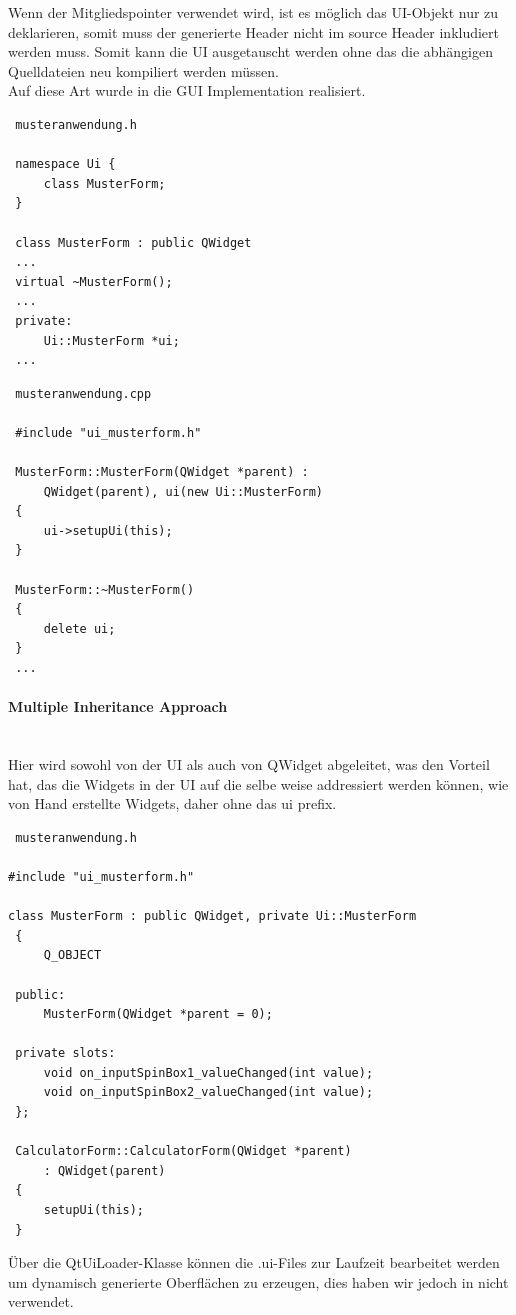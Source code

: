 Wenn der Mitgliedspointer verwendet wird, ist es möglich das UI-Objekt nur zu deklarieren, somit muss der generierte Header nicht im source Header inkludiert werden muss. Somit kann die UI ausgetauscht werden ohne das die abhängigen Quelldateien neu kompiliert werden müssen.\\ Auf diese Art wurde in \EBP die GUI Implementation realisiert. 
\begin{lstlisting}
 musteranwendung.h

 namespace Ui {
     class MusterForm;
 }

 class MusterForm : public QWidget
 ...
 virtual ~MusterForm();
 ...
 private:
     Ui::MusterForm *ui;
 ...
\end{lstlisting}
\begin{lstlisting}
 musteranwendung.cpp

 #include "ui_musterform.h"

 MusterForm::MusterForm(QWidget *parent) :
     QWidget(parent), ui(new Ui::MusterForm)
 {
     ui->setupUi(this);
 }

 MusterForm::~MusterForm()
 {
     delete ui;
 }
 ...
\end{lstlisting}
\paragraph{Multiple Inheritance Approach}\mbox{}\\
Hier wird sowohl von der UI als auch von QWidget abgeleitet, was den Vorteil hat, das die Widgets in der UI auf die selbe weise addressiert werden können, wie von Hand erstellte Widgets, daher ohne das ui prefix.
\begin{lstlisting}
 musteranwendung.h

#include "ui_musterform.h"

class MusterForm : public QWidget, private Ui::MusterForm
 {
     Q_OBJECT

 public:
     MusterForm(QWidget *parent = 0);

 private slots:
     void on_inputSpinBox1_valueChanged(int value);
     void on_inputSpinBox2_valueChanged(int value);
 };

 CalculatorForm::CalculatorForm(QWidget *parent)
     : QWidget(parent)
 {
     setupUi(this);
 }
\end{lstlisting}
Über die QtUiLoader-Klasse können die .ui-Files zur Laufzeit bearbeitet werden um dynamisch generierte Oberflächen zu erzeugen, dies haben wir jedoch in \EBP nicht verwendet.\\
\cite{QT_UIC} 
\newpage
